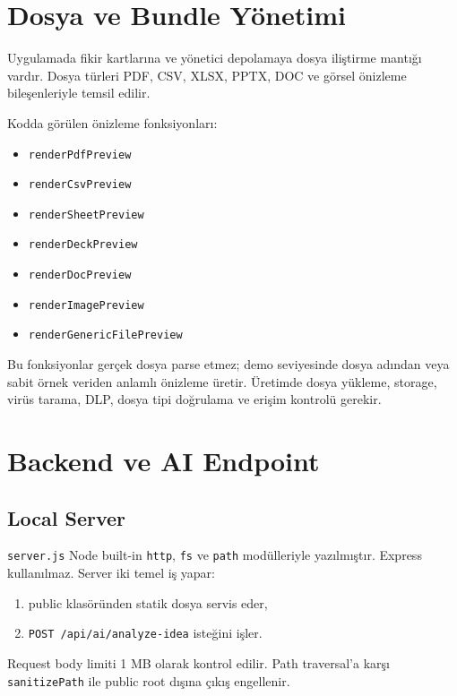 \documentclass[11pt,a4paper]{article}
\newcommand{\code}[1]{\texttt{#1}}
\begin{document}
\section{Dosya ve Bundle Yönetimi}

Uygulamada fikir kartlarına ve yönetici depolamaya dosya iliştirme mantığı vardır. Dosya türleri PDF, CSV, XLSX, PPTX, DOC ve görsel önizleme bileşenleriyle temsil edilir.

Kodda görülen önizleme fonksiyonları:

\begin{itemize}
  \item \code{renderPdfPreview}
  \item \code{renderCsvPreview}
  \item \code{renderSheetPreview}
  \item \code{renderDeckPreview}
  \item \code{renderDocPreview}
  \item \code{renderImagePreview}
  \item \code{renderGenericFilePreview}
\end{itemize}

Bu fonksiyonlar gerçek dosya parse etmez; demo seviyesinde dosya adından veya sabit örnek veriden anlamlı önizleme üretir. Üretimde dosya yükleme, storage, virüs tarama, DLP, dosya tipi doğrulama ve erişim kontrolü gerekir.

\section{Backend ve AI Endpoint}

\subsection{Local Server}

\code{server.js} Node built-in \code{http}, \code{fs} ve \code{path} modülleriyle yazılmıştır. Express kullanılmaz. Server iki temel iş yapar:

\begin{enumerate}
  \item public klasöründen statik dosya servis eder,
  \item \code{POST /api/ai/analyze-idea} isteğini işler.
\end{enumerate}

Request body limiti 1 MB olarak kontrol edilir. Path traversal'a karşı \code{sanitizePath} ile public root dışına çıkış engellenir.
\end{document}
